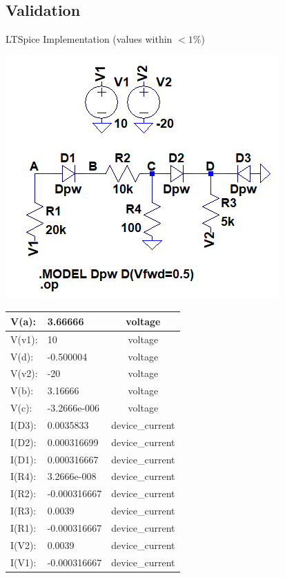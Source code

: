 \documentclass[12pt,letterpaper,titlepage]{article}
\begin{document}
\begin{raggedright}
\clearpage
\subsection{Validation}

\begin{center}
LTSpice Implementation (values within $<1\%$)
\begin{paracol}{2}
\includegraphics[width=.5\textwidth, height=\textheight, keepaspectratio=true]{ds1b}
\switchcolumn
\begin{tabular}{|l|l|c|}
  \hline  V(a):   &   3.66666        &  voltage
\\\hline  V(v1):  &   10             &  voltage
\\\hline  V(d):   &   -0.500004      &  voltage
\\\hline  V(v2):  &   -20            &  voltage
\\\hline  V(b):   &   3.16666        &  voltage
\\\hline  V(c):   &   -3.2666e-006   &  voltage
\\\hline  I(D3):  &   0.0035833      &  device\_current
\\\hline  I(D2):  &   0.000316699    &  device\_current
\\\hline  I(D1):  &   0.000316667    &  device\_current
\\\hline  I(R4):  &   3.2666e-008    &  device\_current
\\\hline  I(R2):  &   -0.000316667   &  device\_current
\\\hline  I(R3):  &   0.0039         &  device\_current
\\\hline  I(R1):  &   -0.000316667   &  device\_current
\\\hline  I(V2):  &   0.0039         &  device\_current
\\\hline  I(V1):  &   -0.000316667   &  device\_current
\\\hline
\end{tabular}
\end{paracol}
\end{center}


\end{raggedright}
\end{document}
